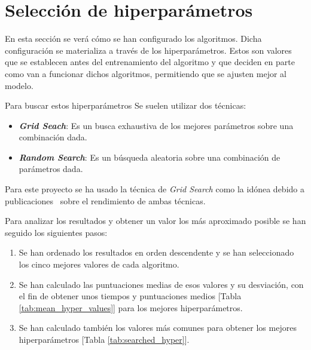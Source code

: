 \newpage

\section{Selección de hiperparámetros }

En esta sección se verá cómo se han configurado los algoritmos. Dicha configuración se materializa a través de los hiperparámetros. Estos son valores que se establecen antes del entrenamiento del algoritmo y que deciden en parte como van a funcionar dichos algoritmos, permitiendo que se ajusten mejor al modelo.

Para buscar estos hiperparámetros  Se suelen utilizar dos técnicas:
\begin{itemize}
    \item \textbf{\textit{Grid Seach}}: Es un busca exhaustiva de los mejores parámetros sobre una combinación dada.
    \item \textbf{\textit{Random Search}}: Es un búsqueda aleatoria sobre una combinación de parámetros dada.
\end{itemize}

Para este proyecto se ha usado la técnica de \textit{Grid Search} como la idónea debido a publicaciones~\cite{bergstra2012random} sobre el rendimiento de ambas técnicas. 

Para analizar los resultados y obtener un valor los más aproximado posible se han seguido los siguientes pasos:
\begin{enumerate}
    \item Se han ordenado los resultados en orden descendente y se han seleccionado los cinco mejores valores de cada algoritmo.
    \item Se han calculado las puntuaciones medias de esos valores y su desviación, con el fin de obtener unos tiempos y puntuaciones medios [Tabla \ref{tab:mean_hyper_values}] para los mejores hiperparámetros.
    \item Se han calculado también los valores más comunes para obtener los mejores hiperparámetros  [Tabla \ref{tab:searched_hyper}].
\end{enumerate}


